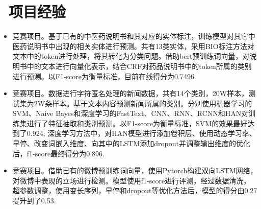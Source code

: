 \documentclass[10pt]{resume}
\begin{document}
\section{\faCogs\ 项目经验}\normalsize
\begin{itemize}
\item{竞赛项目。基于已有的中医药说明书和其对应的实体标注，训练模型对其它中医药说明书中出现的相关实体进行预测。共有13类实体，采用BIO标注方法对文本中的token进行处理，将其转化为分类问题。借助bert预训练词向量，对说明书中的文本进行向量化表示，结合CRF对药品说明书中的token所属的类别进行预测。以F1-score为衡量标准，目前在线得分为0.7496.}
\end{itemize}
\begin{itemize}
\item{竞赛项目。数据进行字符匿名处理的新闻数据，共有14个类别，20W样本，测试集为2W条样本。基于文本内容预测新闻所属的类别。分别使用机器学习的SVM、Naive Bayes和深度学习的FastText、CNN、RNN、RCNN和HAN对训练集进行了特征抽取和类别预测。以F1-score为衡量标准，SVM的效果最好达到了0.924; 深度学习方法中，对HAN模型进行添加卷积层、使用动态学习率、早停、改变词嵌入维度、向其中的LSTM添加dropout并调整输出维度的优化后，f1-score最终得分为0.896.}
\end{itemize}
 \begin{itemize}
 \item {竞赛项目。借助已有的微博预训练词向量，使用Pytorch构建双向LSTM网络，对微博中表现的立场进行检测。模型使用f1-score进行评测，经过数据清洗，超参数调整，使用变长序列，早停和dropout等优化方法后，模型的得分由0.27提升到了0.53.}
 \end{itemize}
\end{document}
